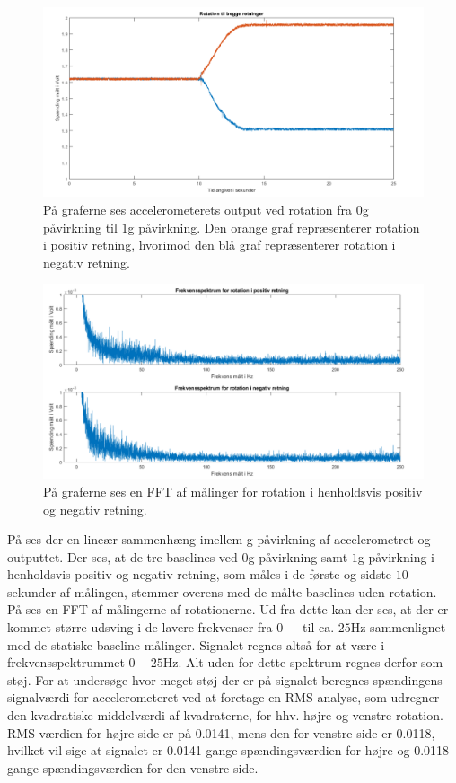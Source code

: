 \begin{figure}[H]
	\centering
	\includegraphics[scale=0.45]{figures/cProblemloesning/Pilotforsoeg_Rotation.png}
	\caption{På graferne ses accelerometerets output ved rotation fra $0$g påvirkning til $1$g påvirkning. Den orange graf repræsenterer rotation i positiv retning, hvorimod den blå graf repræsenterer rotation i negativ retning.}
	\label{Fig:Pilot_Rottid}
\end{figure}
\begin{figure}[H]
	\centering
	\includegraphics[scale=0.5]{figures/cProblemloesning/Pilotforsoeg_RotationFrekvens.png}
	\caption{På graferne ses en FFT af målinger for rotation i henholdsvis positiv og negativ retning.}
	\label{Fig:Pilot_Rotfrek}
\end{figure}
På  ses der en lineær sammenhæng imellem g-påvirkning af accelerometret og outputtet. Der ses, at de tre baselines ved $0$g påvirkning samt $1$g påvirkning i henholdsvis positiv og negativ retning, som måles i de første og sidste $10$ sekunder af målingen, stemmer overens med de målte baselines uden rotation. \\
På  ses en FFT af målingerne af rotationerne. Ud fra dette kan der ses, at der er kommet større udsving i de lavere frekvenser fra $0-$ til ca. $25$Hz sammenlignet med de statiske baseline målinger. Signalet regnes altså for at være i frekvensspektrummet $0-25$Hz. Alt uden for dette spektrum regnes derfor som støj. For at undersøge hvor meget støj der er på signalet beregnes spændingens signalværdi for accelerometeret ved at foretage en RMS-analyse, som udregner den kvadratiske middelværdi af kvadraterne, for hhv. højre og venstre rotation. RMS-værdien for højre side er på 0.0141, mens den for venstre side er 0.0118, hvilket vil sige at signalet er 0.0141 gange spændingsværdien for højre og 0.0118 gange spændingsværdien for den venstre side.

